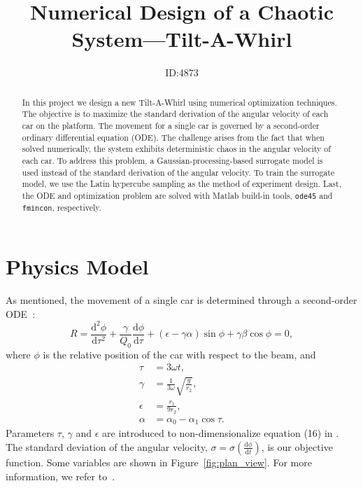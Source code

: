 \documentclass[a4paper]{article}
\title{Numerical Design of a Chaotic System---Tilt-A-Whirl}
\author{ID:4873}
\newcommand{\diff}[0]{\mathrm{d}}
\begin{document}
 \maketitle
 
\begin{abstract}
   In this project we design a new Tilt-A-Whirl using numerical optimization techniques. The objective is to maximize the standard derivation of the angular velocity of each car on the platform. The movement for a single car is governed by a second-order ordinary differential equation (ODE). The challenge arises from the fact that when solved numerically, the system exhibits deterministic chaos in the angular velocity of each car. To address this problem, a Gaussian-processing-based surrogate model is used instead of the standard derivation of the angular velocity. To train the surrogate model, we use the Latin hypercube sampling as the method of experiment design. Last, the ODE and optimization problem are solved with Matlab\textsuperscript{\textregistered} build-in tools, \texttt{ode45} and \texttt{fmincon}, respectively. 
\end{abstract}

\section{Physics Model} \label{sec:physics}
As mentioned, the movement of a single car is determined through a second-order ODE~\cite{doi:10.1119/1.17742}:
\begin{equation} \label{eq:ode}
R = \frac{\diff^2 \phi}{\diff\tau^2} + \frac{\gamma}{Q_0}\frac{\diff\phi}{\diff\tau} + (\epsilon - \gamma\alpha)\sin{\phi} + \gamma\beta\cos{\phi} = 0,
\end{equation}
where $\phi$ is the relative position of the car with respect to the beam, and
\begin{equation}
\begin{aligned}
\tau &= 3\omega t, \\
\gamma &= \frac{1}{3\omega}\sqrt{\frac{g}{r_2}}, \\
\epsilon &= \frac{r_1}{9r_2}, \\
\alpha &= \alpha_0 - \alpha_1 \cos\tau.
\end{aligned}
\end{equation}
Parameters $\tau$, $\gamma$ and $\epsilon$ are introduced to non-dimensionalize equation (16) in \cite{doi:10.1119/1.17742}. The standard deviation of the angular velocity, $\sigma = \sigma(\frac{\diff \phi}{\diff t})$, is our objective function. Some variables are shown in Figure~\ref{fig:plan_view}. For more information, we refer to~\cite{doi:10.1119/1.17742}.
\end{document}
